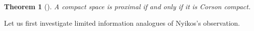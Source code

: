 \documentclass{amsart}
\newtheorem{theorem}{Theorem}[section]
\theoremstyle{definition}
\begin{document}
  \begin{theorem}[\cite{MR3227201}]
    A compact space is proximal if and only if it is Corson compact.
  \end{theorem}

  Let us first investigate limited information analogues of Nyikos's
  observation.


\newpage








\end{document}
